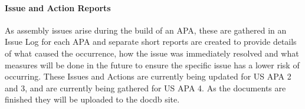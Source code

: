 \paragraph{Issue and Action Reports} As assembly issues arise during the build of an APA, these are gathered in an Issue Log for each APA and separate short reports are created to provide details of what caused the occurrence, how the issue was immediately resolved and what measures will be done in the future to ensure the specific issue has a lower risk of occurring.  These Issues and Actions are currently being updated for US APA 2 and 3, and are currently being gathered for US APA 4.  As the documents are finished they will be uploaded to the docdb site.






